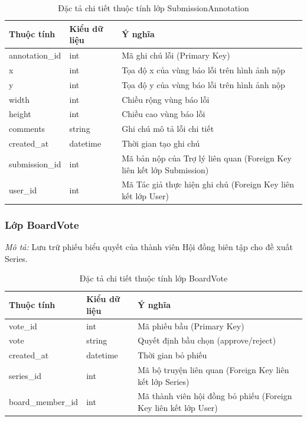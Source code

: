 \begin{table}[H]
\centering
\renewcommand{\arraystretch}{1.3}
\begin{tabularx}{\textwidth}{|p{4cm}|p{3cm}|>{\raggedright\arraybackslash}X|}
\hline
\rowcolor{tableheader}
\textbf{Thuộc tính} & \textbf{Kiểu dữ liệu} & \textbf{Ý nghĩa} \\ \hline
annotation\_id & int & Mã ghi chú lỗi (Primary Key) \\ \hline
x & int & Tọa độ x của vùng báo lỗi trên hình ảnh nộp \\ \hline
y & int & Tọa độ y của vùng báo lỗi trên hình ảnh nộp \\ \hline
width & int & Chiều rộng vùng báo lỗi \\ \hline
height & int & Chiều cao vùng báo lỗi \\ \hline
comments & string & Ghi chú mô tả lỗi chi tiết \\ \hline
created\_at & datetime & Thời gian tạo ghi chú \\ \hline
submission\_id & int & Mã bản nộp của Trợ lý liên quan (Foreign Key liên kết lớp Submission) \\ \hline
user\_id & int & Mã Tác giả thực hiện ghi chú (Foreign Key liên kết lớp User) \\ \hline
\end{tabularx}
\caption{Đặc tả chi tiết thuộc tính lớp SubmissionAnnotation}
\label{tab:class_submissionannotation}
\end{table}


\subsubsection{Lớp BoardVote}
\textit{Mô tả:} Lưu trữ phiếu biểu quyết của thành viên Hội đồng biên tập cho đề xuất Series.

\begin{table}[H]
\centering
\renewcommand{\arraystretch}{1.3}
\begin{tabularx}{\textwidth}{|p{4cm}|p{3cm}|>{\raggedright\arraybackslash}X|}
\hline
\rowcolor{tableheader}
\textbf{Thuộc tính} & \textbf{Kiểu dữ liệu} & \textbf{Ý nghĩa} \\ \hline
vote\_id & int & Mã phiếu bầu (Primary Key) \\ \hline
vote & string & Quyết định bầu chọn (approve/reject) \\ \hline
created\_at & datetime & Thời gian bỏ phiếu \\ \hline
series\_id & int & Mã bộ truyện liên quan (Foreign Key liên kết lớp Series) \\ \hline
board\_member\_id & int & Mã thành viên hội đồng bỏ phiếu (Foreign Key liên kết lớp User) \\ \hline
\end{tabularx}
\caption{Đặc tả chi tiết thuộc tính lớp BoardVote}
\label{tab:class_boardvote}
\end{table}


